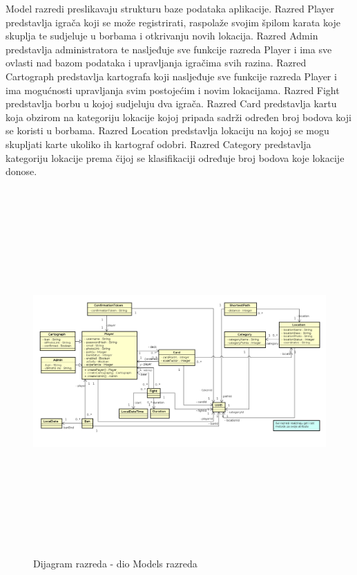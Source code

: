			{Model razredi preslikavaju strukturu baze podataka aplikacije. Razred Player predstavlja igrača koji se može registrirati, raspolaže svojim špilom karata koje skuplja te sudjeluje u borbama i otkrivanju novih lokacija. Razred Admin predstavlja administratora te nasljeđuje sve funkcije razreda Player i ima sve ovlasti nad bazom podataka i upravljanja igračima svih razina. Razred Cartograph predstavlja kartografa koji nasljeđuje sve funkcije razreda Player i ima mogućnosti upravljanja svim postojećim i novim lokacijama. Razred Fight predstavlja borbu u kojoj sudjeluju dva igrača. Razred Card predstavlja kartu koja obzirom na kategoriju lokacije kojoj pripada sadrži određen broj bodova koji se koristi u borbama. Razred Location predstavlja lokaciju na kojoj se mogu skupljati karte ukoliko ih kartograf odobri. Razred Category predstavlja kategoriju lokacije prema čijoj se klasifikaciji određuje broj bodova koje lokacije donose.}
			
			\begin{figure}[H]
				\includegraphics[width=\linewidth, height=14cm]{dijagrami/models_diagram}				
				\centering
				\caption{Dijagram razreda - dio Models razreda}
				\label{}
			\end{figure}
			
			\eject
		
